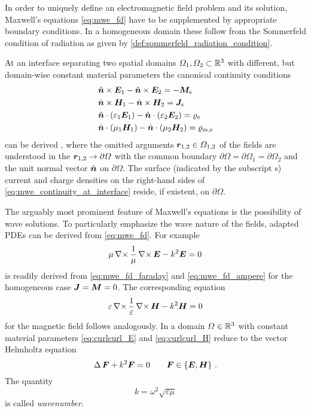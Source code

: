 In order to uniquely define an electromagnetic field problem and its solution,
Maxwell's equations \eqref{eq:mwe_fd} have to be supplemented by appropriate
boundary conditions.
In a homogeneous domain these follow from the Sommerfeld condition of radiation
as given by \cref{def:sommerfeld_radiation_condition}.

At an interface separating two spatial domains $\Omega_1, \Omega_2 \subset \mathbb{R}^3$
with different, but domain-wise constant material parameters the canonical
continuity conditions
\begin{subequations}\label{eq:mwe_continuity_at_interface}
	\begin{align}
		&\uv{n} \times \pvec{E}_1 - \uv{n} \times \pvec{E}_2 =
		- \pvec{M}_\mathrm{s} \\
		&\uv{n} \times \pvec{H}_1 - \uv{n} \times \pvec{H}_2 =
		\pvec{J}_\mathrm{s} \\
		&\uv{n} \cdot \left(\varepsilon_1 \pvec{E}_1\right) -
		\uv{n} \cdot \left(\varepsilon_2 \pvec{E}_2\right) = 
		\varrho_\mathrm{s} \\
		&\uv{n} \cdot \left(\mu_1 \pvec{H}_1\right) -
		\uv{n} \cdot \left(\mu_2 \pvec{H}_2\right) = 
		\varrho_\mathrm{m,s}
	\end{align}
\end{subequations}
can be derived \cite[p20]{Jackson2013}, where the omitted arguments
$\robs_{1,2} \in \Omega_{1,2}$ of the fields are understood in the
$\robs_{1,2} \to \partial \Omega$ with the common boundary
$\partial \Omega = \partial \Omega_1 = \partial \Omega_2$ and the unit normal
vector $\uv{n}$ on $\partial \Omega$.
The surface (indicated by the subscript $\mathrm{s}$) current and charge
densities on the right-hand sides of \eqref{eq:mwe_continuity_at_interface}
reside, if existent, on $\partial\Omega$.

The arguably most prominent feature of Maxwell's equations is the possibility
of wave solutions.
To particularly emphasize the wave nature of the fields, adapted \acp{PDE}
can be derived from \eqref{eq:mwe_fd}.
For example
\begin{equation}\label{eq:curlcurl_E}
	\mu\curl\frac{1}{\mu}\curl\pvec{E} - k^2\pvec{E} = 0 
\end{equation}
is readily derived from \eqref{eq:mwe_fd_faraday} and \eqref{eq:mwe_fd_ampere}
for the homogeneous case $\pvec{J} = \pvec{M} = 0$.
The corresponding equation
\begin{equation}\label{eq:curlcurl_H}
	\varepsilon\curl\frac{1}{\varepsilon}\curl\pvec{H} - k^2\pvec{H} = 0
\end{equation}
for the magnetic field follows analogously.
In a domain $\Omega \in \mathbb{R}^3$ with constant material parameters
\eqref{eq:curlcurl_E} and \eqref{eq:curlcurl_H} reduce to the vector Helmholtz
equation
\begin{equation}\label{eq:vector_helmholtz_equation}
	\laplace \pvec{F} + k^2 \pvec{F} = 0 \qquad
	\pvec{F} \in \left\{\pvec{E}, \pvec{H}\right\}
	\, .
\end{equation}
The quantity
\begin{equation}\label{eq:wavenumber}
	k = \omega^2 \sqrt{\varepsilon \mu}
\end{equation}
is called \emph{wavenumber}.

